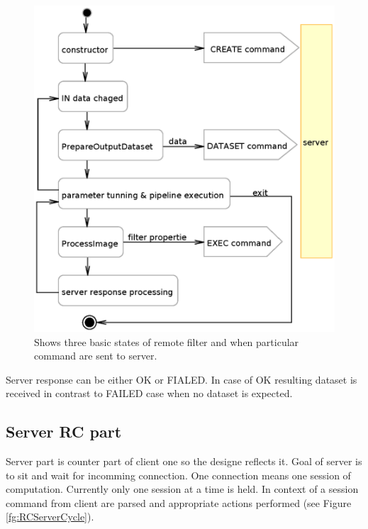 \begin{figure}
    \centering
    \includegraphics[width=12cm]{data/RCClientCycle}
    \caption[Remote Medv4D filter]{Shows three basic states of remote filter and when particular command are sent to server.}
    \label{fg:RCClientCycle}
\end{figure}

Server response can be either OK or FIALED. In case of OK resulting dataset is received in contrast to FAILED case when no dataset is expected.

\subsection{Server RC part}

Server part is counter part of client one so the designe reflects it. Goal of server is to sit and wait for incomming connection. One connection means one session of computation. Currently only one session at a time is held. In context of a session command from client are parsed and appropriate actions performed (see Figure \ref{fg:RCServerCycle}).

